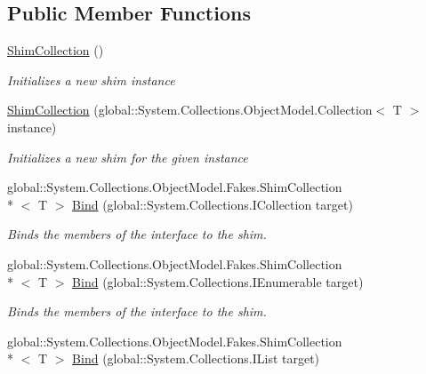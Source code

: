 \subsection*{Public Member Functions}
\begin{DoxyCompactItemize}
\item 
\hyperlink{class_system_1_1_collections_1_1_object_model_1_1_fakes_1_1_shim_collection_3_01_t_01_4_a89c31b71d3821e746b11b8fa8f40e516}{Shim\-Collection} ()
\begin{DoxyCompactList}\small\item\em Initializes a new shim instance\end{DoxyCompactList}\item 
\hyperlink{class_system_1_1_collections_1_1_object_model_1_1_fakes_1_1_shim_collection_3_01_t_01_4_ada2b6af1e2742eab25e675c5fe468f7d}{Shim\-Collection} (global\-::\-System.\-Collections.\-Object\-Model.\-Collection$<$ T $>$ instance)
\begin{DoxyCompactList}\small\item\em Initializes a new shim for the given instance\end{DoxyCompactList}\item 
global\-::\-System.\-Collections.\-Object\-Model.\-Fakes.\-Shim\-Collection\\*
$<$ T $>$ \hyperlink{class_system_1_1_collections_1_1_object_model_1_1_fakes_1_1_shim_collection_3_01_t_01_4_a3b7246f65b3943358c57ddd46266a08d}{Bind} (global\-::\-System.\-Collections.\-I\-Collection target)
\begin{DoxyCompactList}\small\item\em Binds the members of the interface to the shim.\end{DoxyCompactList}\item 
global\-::\-System.\-Collections.\-Object\-Model.\-Fakes.\-Shim\-Collection\\*
$<$ T $>$ \hyperlink{class_system_1_1_collections_1_1_object_model_1_1_fakes_1_1_shim_collection_3_01_t_01_4_a24fe58e0c8fb843c8140714dbd23f0d4}{Bind} (global\-::\-System.\-Collections.\-I\-Enumerable target)
\begin{DoxyCompactList}\small\item\em Binds the members of the interface to the shim.\end{DoxyCompactList}\item 
global\-::\-System.\-Collections.\-Object\-Model.\-Fakes.\-Shim\-Collection\\*
$<$ T $>$ \hyperlink{class_system_1_1_collections_1_1_object_model_1_1_fakes_1_1_shim_collection_3_01_t_01_4_afa358e76b5d7688ddb2b0524a9035ef7}{Bind} (global\-::\-System.\-Collections.\-I\-List target)

\end{DoxyCompactItemize}
